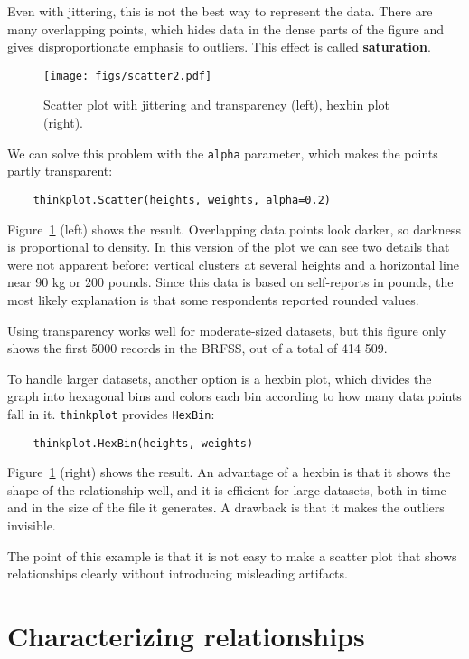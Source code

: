 \documentclass[12pt]{book}
\begin{document}
Even with jittering, this is not the best way to represent the data.
There are many overlapping points, which hides data
in the dense parts of the figure and gives disproportionate emphasis
to outliers.  This effect is called {\bf saturation}.

\begin{figure}
\centerline{\texttt{[image: figs/scatter2.pdf]}}
\caption{Scatter plot with jittering and transparency (left),
hexbin plot (right).}
\label{scatter2}
\end{figure}

We can solve this problem with the {\tt alpha} parameter, which makes
the points partly transparent:
%
\begin{verbatim}
    thinkplot.Scatter(heights, weights, alpha=0.2)
\end{verbatim}
%
Figure~\ref{scatter2} (left) shows the result.  Overlapping data
points look darker, so darkness is proportional to density.  In this
version of the plot we can see two details that were not apparent before:
vertical clusters at several heights and a horizontal line near 90 kg
or 200 pounds.  Since this data is based on self-reports in pounds,
the most likely explanation is that some respondents reported
rounded values.

Using transparency works well for moderate-sized datasets, but this
figure only shows the first 5000 records in the BRFSS, out of a total
of 414 509.

To handle larger datasets, another option is a hexbin plot, which
divides the graph into hexagonal bins and colors each bin according to
how many data points fall in it.  {\tt thinkplot} provides 
{\tt HexBin}:
%
\begin{verbatim}
    thinkplot.HexBin(heights, weights)
\end{verbatim}
%
Figure~\ref{scatter2} (right) shows the result.  An advantage of a
hexbin is that it shows the shape of the relationship well, and it is
efficient for large datasets, both in time and in the size of the file
it generates.  A drawback is that it makes the outliers invisible.

The point of this example is that it is
not easy to make a scatter plot that shows relationships clearly
without introducing misleading artifacts.


\section{Characterizing relationships}
\label{characterizing}
\end{document}
